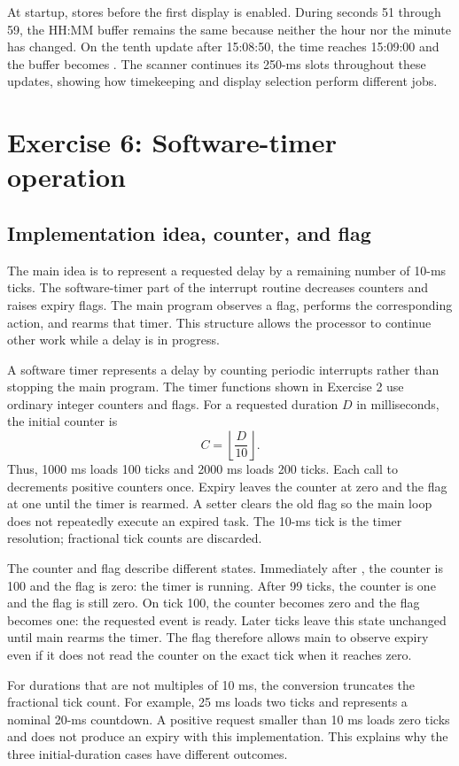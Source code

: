\documentclass[a4paper]{article}
\newcommand{\code}[1]{\texttt{\detokenize{#1}}}
\newcommand{\topic}[1]{\subsection{#1}}
\begin{document}
At startup, \code{updateClockBuffer()} stores \code{{1, 5, 0, 8}} before the
first display is enabled. During seconds 51 through 59, the HH:MM buffer
remains the same because neither the hour nor the minute has changed. On the
tenth update after 15:08:50, the time reaches 15:09:00 and the buffer becomes
\code{{1, 5, 0, 9}}. The scanner continues its 250-ms slots throughout these
updates, showing how timekeeping and display selection perform different jobs.

\section{Exercise 6: Software-timer operation}
\topic{Implementation idea, counter, and flag}
The main idea is to represent a requested delay by a remaining number of
10-ms ticks. The software-timer part of the interrupt routine decreases
counters and raises expiry flags. The main program observes a flag, performs the corresponding action,
and rearms that timer. This structure allows the processor to continue other
work while a delay is in progress.

A software timer represents a delay by counting periodic interrupts rather
than stopping the main program. The timer functions shown in Exercise 2 use
ordinary integer counters and flags. For a requested duration \(D\) in
milliseconds, the initial counter is
\[
C=\left\lfloor\frac{D}{10}\right\rfloor.
\]
Thus, 1000 ms loads 100 ticks and 2000 ms loads 200 ticks. Each call to
\code{timer_run()} decrements positive counters once. Expiry leaves the
counter at zero and the flag at one until the timer is rearmed. A setter clears
the old flag so the main loop does not repeatedly execute an expired task.
The 10-ms tick is the timer resolution; fractional tick counts are discarded.

The counter and flag describe different states. Immediately after
\code{setTimer0(1000)}, the counter is 100 and the flag is zero: the timer is
running. After 99 ticks, the counter is one and the flag is still zero. On
tick 100, the counter becomes zero and the flag becomes one: the requested
event is ready. Later ticks leave this state unchanged until main rearms the
timer. The flag therefore allows main to observe expiry even if it does not
read the counter on the exact tick when it reaches zero.

For durations that are not multiples of 10 ms, the conversion truncates the
fractional tick count. For example, 25 ms loads two ticks and represents a
nominal 20-ms countdown. A positive request smaller than 10 ms loads zero
ticks and does not produce an expiry with this implementation. This explains
why the three initial-duration cases have different outcomes.
\end{document}
